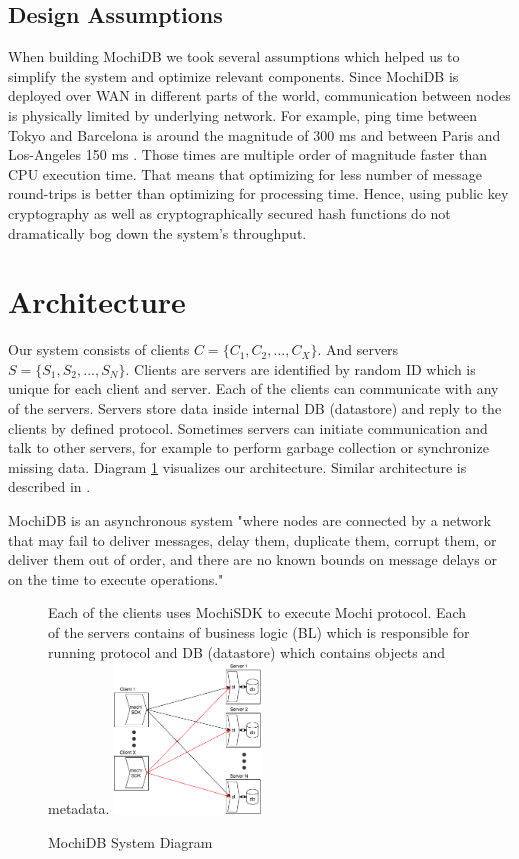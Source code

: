 \documentclass[letterpaper,twocolumn,10pt]{article}
\begin{document}
\subsection{Design Assumptions}
When building MochiDB we took several assumptions which helped us to simplify the system and optimize relevant components. Since MochiDB is deployed over WAN in different parts of the world, communication between nodes is physically limited by underlying network. For example, ping time between Tokyo and Barcelona is around the magnitude of 300 ms and between Paris and Los-Angeles 150 ms \cite{PingLatencies}. Those times are multiple order of magnitude faster than CPU execution time. That means that optimizing for less number of message round-trips is better than optimizing for processing time. Hence, using public key cryptography as well as cryptographically secured hash functions do not dramatically bog down the system's throughput. 

\section{Architecture}

Our system consists of clients \( C = \{ C_{1},C_{2}, ..., C_{X} \} \). And servers \( S = \{ S_{1}, S_{2}, ..., S_{N} \} \). Clients are servers are identified by random ID which is unique for each client and server. Each of the clients can communicate with any of the servers. Servers store data inside internal DB (datastore) and reply to the clients by defined protocol. Sometimes servers can initiate communication and talk to other servers, for example to perform garbage collection or synchronize missing data.  Diagram \ref{fig:system_view} visualizes our architecture. Similar architecture is described in \cite{HQ_replication}.

MochiDB is an asynchronous system "where nodes are connected by a network that may fail to deliver messages, delay them, duplicate them, corrupt them, or
deliver them out of order, and there are no known bounds on message delays or on the time to execute operations." \cite{HQ_replication}

\begin{figure}
\caption{MochiDB System Diagram}
\small
Each of the clients uses MochiSDK to execute Mochi protocol. Each of the servers contains of business logic (BL) which is responsible for running protocol and DB (datastore) which contains objects and metadata.
\centering
\includegraphics[width=0.35\textwidth]{System_View.png}
\label{fig:system_view}
\end{figure}
\end{document}
